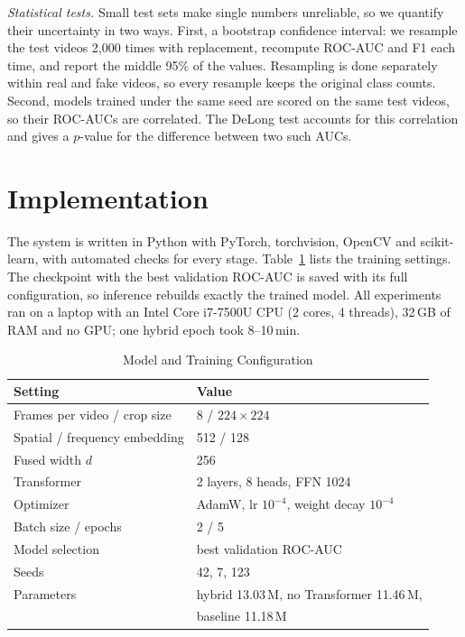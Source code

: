 \documentclass[conference]{IEEEtran}
\begin{document}
\textit{Statistical tests.} Small test sets make single numbers unreliable,
so we quantify their uncertainty in two ways. First, a bootstrap confidence
interval: we resample the test videos 2{,}000 times with replacement,
recompute ROC-AUC and F1 each time, and report the middle 95\% of the
values. Resampling is done separately within real and fake videos, so every
resample keeps the original class counts. Second, models trained under the
same seed are scored on the same test videos, so their ROC-AUCs are
correlated. The DeLong test \cite{delong1988auc} accounts for this
correlation and gives a $p$-value for the difference between two such AUCs.

\section{Implementation}

The system is written in Python with PyTorch, torchvision, OpenCV and
scikit-learn, with automated checks for every stage. Table~\ref{tab:config}
lists the training settings. The checkpoint with the best validation ROC-AUC
is saved with its full configuration, so inference rebuilds exactly the
trained model. All experiments ran on a laptop with an Intel Core i7-7500U CPU
(2 cores, 4 threads), 32\,GB of RAM and no GPU; one hybrid epoch took
8--10\,min.

\begin{table}[t]
\caption{Model and Training Configuration}
\label{tab:config}
\centering
\footnotesize
\begin{tabular}{ll}
\toprule
\textbf{Setting} & \textbf{Value} \\
\midrule
Frames per video / crop size & 8 / $224\times224$ \\
Spatial / frequency embedding & 512 / 128 \\
Fused width $d$ & 256 \\
Transformer & 2 layers, 8 heads, FFN 1024 \\
Optimizer & AdamW, lr $10^{-4}$, weight decay $10^{-4}$ \\
Batch size / epochs & 2 / 5 \\
Model selection & best validation ROC-AUC \\
Seeds & 42, 7, 123 \\
Parameters & hybrid 13.03\,M, no Transformer 11.46\,M, \\
 & baseline 11.18\,M \\
\bottomrule
\end{tabular}
\end{table}
\end{document}
